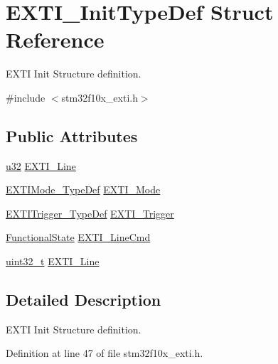 \hypertarget{struct_e_x_t_i___init_type_def}{}\section{E\+X\+T\+I\+\_\+\+Init\+Type\+Def Struct Reference}
\label{struct_e_x_t_i___init_type_def}


E\+X\+TI Init Structure definition.  




{\ttfamily \#include $<$stm32f10x\+\_\+exti.\+h$>$}

\subsection*{Public Attributes}
\begin{DoxyCompactItemize}
\item 
\hyperlink{agilefox_2library_2inc_2stm32f10x__type_8h_a2caf5cd7bcdbe1eefa727f44ffb10bac}{u32} \hyperlink{struct_e_x_t_i___init_type_def_a490f6df72047947d2d04228bc932c72c}{E\+X\+T\+I\+\_\+\+Line}
\item 
\hyperlink{agilefox_2library_2inc_2stm32f10x__exti_8h_ad5e69af98dc0dfdf64417adc1cf57929}{E\+X\+T\+I\+Mode\+\_\+\+Type\+Def} \hyperlink{struct_e_x_t_i___init_type_def_a741816862b9cd43cc80781dc89150e7e}{E\+X\+T\+I\+\_\+\+Mode}
\item 
\hyperlink{agilefox_2library_2inc_2stm32f10x__exti_8h_a9da190f5425d1b421a06bced8cc48e9b}{E\+X\+T\+I\+Trigger\+\_\+\+Type\+Def} \hyperlink{struct_e_x_t_i___init_type_def_ab0bd8417e78fe2b43eed79e44064510c}{E\+X\+T\+I\+\_\+\+Trigger}
\item 
\hyperlink{agilefox_2library_2inc_2stm32f10x__type_8h_ac9a7e9a35d2513ec15c3b537aaa4fba1}{Functional\+State} \hyperlink{struct_e_x_t_i___init_type_def_ac1769bc5badaef4cffbcf105e3fe1c27}{E\+X\+T\+I\+\_\+\+Line\+Cmd}
\item 
\hyperlink{_p_e___types_8h_a33594304e786b158f3fb30289278f5af}{uint32\+\_\+t} \hyperlink{struct_e_x_t_i___init_type_def_a1b5bb38e1df331f764b830a1e8ec171f}{E\+X\+T\+I\+\_\+\+Line}
\end{DoxyCompactItemize}


\subsection{Detailed Description}
E\+X\+TI Init Structure definition. 

Definition at line 47 of file stm32f10x\+\_\+exti.\+h.



